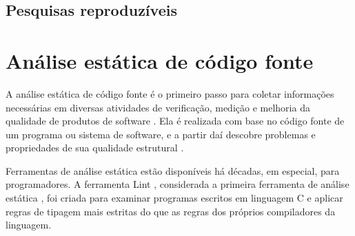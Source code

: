 \subsection{Pesquisas reproduzíveis}


%
%




%
%
%

\section{Análise estática de código fonte} \label{analise-estatica}

%
%
%


A análise estática de código fonte é o primeiro passo para coletar informações
necessárias em diversas atividades de verificação, medição e melhoria da
qualidade de produtos de software \cite{Cruz2009, Kirkov2010}. Ela é
realizada com base no código fonte de um programa ou sistema de software, e a
partir daí descobre problemas e propriedades de sua qualidade estrutural
\cite{Chess2007}.

Ferramentas de análise estática estão disponíveis há décadas, em especial,
para programadores. A ferramenta Lint \cite{Johnson1978}, considerada a
primeira ferramenta de análise estática \cite{Gosain2015}, foi criada para
examinar programas escritos em linguagem C e aplicar regras de tipagem mais
estritas do que as regras dos próprios compiladores da linguagem.

